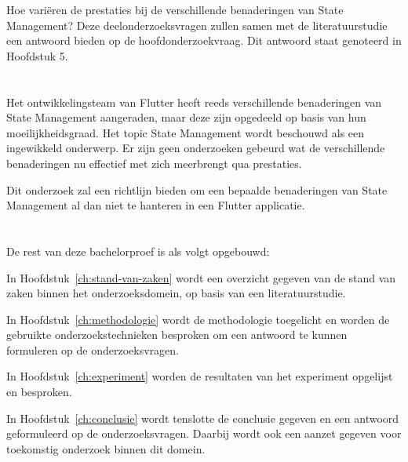 Hoe variëren de prestaties bij de verschillende benaderingen van State Management?
\newline
Deze deelonderzoeksvragen zullen samen met de literatuurstudie een antwoord bieden op de hoofdonderzoekvraag. Dit antwoord staat genoteerd in Hoofdstuk 5.


\section{}
\label{sec:onderzoeksdoelstelling}

Het ontwikkelingsteam van Flutter heeft reeds verschillende benaderingen van State Management aangeraden, maar deze zijn opgedeeld op basis van hun moeilijkheidsgraad. Het topic State Management wordt beschouwd als een ingewikkeld onderwerp. Er zijn geen onderzoeken gebeurd wat de verschillende benaderingen nu effectief met zich meerbrengt qua prestaties.

Dit onderzoek zal een richtlijn bieden om een bepaalde benaderingen van State Management al dan niet te hanteren in een Flutter applicatie. 

\section{}
\label{sec:opzet-bachelorproef}


De rest van deze bachelorproef is als volgt opgebouwd:

In Hoofdstuk~\ref{ch:stand-van-zaken} wordt een overzicht gegeven van de stand van zaken binnen het onderzoeksdomein, op basis van een literatuurstudie.

In Hoofdstuk~\ref{ch:methodologie} wordt de methodologie toegelicht en worden de gebruikte onderzoekstechnieken besproken om een antwoord te kunnen formuleren op de onderzoeksvragen.

In Hoofdstuk~\ref{ch:experiment} worden de resultaten van het experiment opgelijst en besproken.

In Hoofdstuk~\ref{ch:conclusie} wordt tenslotte de conclusie gegeven en een antwoord geformuleerd op de onderzoeksvragen. Daarbij wordt ook een aanzet gegeven voor toekomstig onderzoek binnen dit domein.
